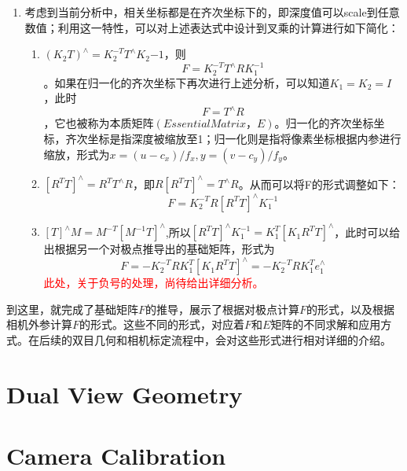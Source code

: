 \begin{enumerate}
\item 考虑到当前分析中，相关坐标都是在齐次坐标下的，即深度值可以scale到任意数值；利用这一特性，可以对上述表达式中设计到叉乘的计算进行如下简化：
\begin{enumerate}
\item  $(K_2T)^{\wedge}=K_2^{-T}T^{\wedge}K_2{-1}$，则\[ F=K_2^{-T}T^{\wedge}RK_1^{-1}\]。如果在归一化的齐次坐标下再次进行上述分析，可以知道$K_1=K_2=I$，此时\[F=T^{\wedge}R\]，它也被称为本质矩阵$(EssentialMatrix，E)$。归一化的齐次坐标坐标，齐次坐标是指深度被缩放至1；归一化则是指将像素坐标根据内参进行缩放，形式为$ x=(u-c_x)/f_x, y =(v-c_y)/f_y$。
\item $\left[ R^TT\right]^{\wedge}=R^TT^{\wedge}R$，即$R\left[ R^TT\right]^{\wedge}=T^{\wedge}R$。从而可以将F的形式调整如下：\[F=K_2^{-T}R[R^TT]^{\wedge} K_1^{-1}\]
\item $[T]^{\wedge}M=M^{-T}[M^{-1}T]^\wedge$,所以$[R^TT]^{\wedge} K_1^{-1}=K_1^T[K_1R^TT]^\wedge$，此时可以给出根据另一个对极点推导出的基础矩阵，形式为
\[F=-K_2^{-T}RK_1^T[K_1R^TT]^\wedge=-K_2^{-T}RK_1^Te_1^\wedge\]
\textcolor{red}{此处，关于负号的处理，尚待给出详细分析。}
\end{enumerate}
\end{enumerate}
到这里，就完成了基础矩阵$F$的推导，展示了根据对极点计算$F$的形式，以及根据相机外参计算$F$的形式。这些不同的形式，对应着$F$和$E$矩阵的不同求解和应用方式。在后续的双目几何和相机标定流程中，会对这些形式进行相对详细的介绍。
\section{Dual View Geometry}
\section{Camera Calibration}


